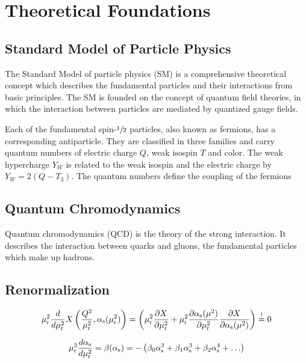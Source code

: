 
\chapter{Theoretical Foundations}
\label{sec:theoretical_foundations}

\section{Standard Model of Particle Physics}

The Standard Model of particle physics (SM) is a comprehensive theoretical
concept which describes the fundamental particles and their interactions from
basic principles. The SM is founded on the concept of quantum field theories, in
which the interaction between particles are mediated by quantized gauge fields.

Each of the fundamental spin-$\sfrac{1}{2}$ particles, also known as fermions,
has a corresponding antiparticle. They are classified in three families and
carry quantum numbers of electric charge $Q$, weak isospin $T$ and color. The
weak hypercharge $Y_W$ is related to the weak isospin and the electric charge by
$Y_W = 2(Q-T_3)$. The quantum numbers define the coupling of the fermions

\section{Quantum Chromodynamics}

Quantum chromodynamics (QCD) is the theory of the strong interaction. It
describes the interaction between quarks and gluons, the fundamental particles
which make up hadrons.

\section{Renormalization}

\begin{equation} 
    \mu_{\mathrm{r}}^2 \frac{d}{d \mu_{\mathrm{r}}^2} X \left(\frac{Q^2}{\mu_{\mathrm{r}}^2},\alpha_\mathrm{s}(\mu_{\mathrm{r}}^2)\right) = \left(
    \mu_{\mathrm{r}}^2 \frac{\partial X}{\partial \mu_{\mathrm{r}}^2} + \mu_{\mathrm{r}}^2 \frac{\partial
    \alpha_\mathrm{s}(\mu^2)}{\partial \mu_{\mathrm{r}}^2} \frac{\partial X}{\partial \alpha_\mathrm{s}(\mu^2)} \right) \stackrel{!}{=} 0 
\end{equation}


\begin{equation}
    \mu_{\mathrm{r}}^2 \frac{d \alpha_\mathrm{s}}{d \mu_{\mathrm{r}}^2} = \beta(\alpha_\mathrm{s}) = - \left( \beta_0 \alpha_\mathrm{s}^2 + \beta_1 \alpha_\mathrm{s}^3
    + \beta_2 \alpha_\mathrm{s}^4 + \ldots \right)
\end{equation}

